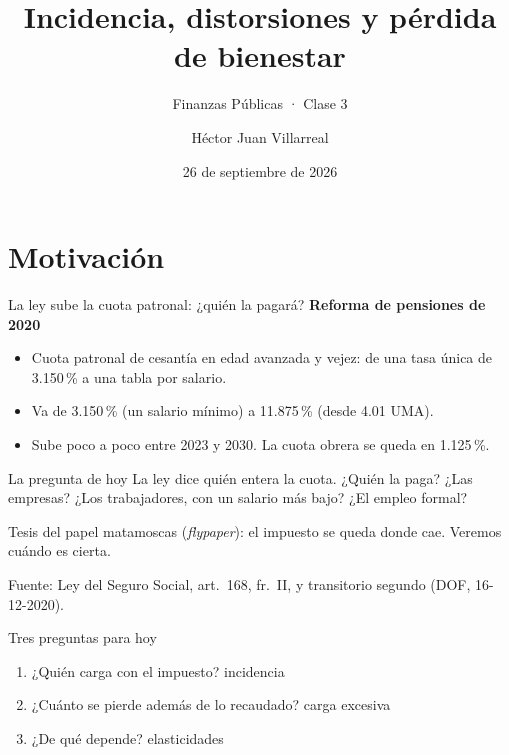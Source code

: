 \documentclass[aspectratio=169,11pt]{beamer}
\title{Incidencia, distorsiones y pérdida de bienestar}
\subtitle{Finanzas Públicas · Clase 3}
\author{Héctor Juan Villarreal}
\institute{Maestría en Economía Aplicada\\Escuela de Gobierno y Transformación Pública · Tec de Monterrey}
\date{26 de septiembre de 2026}
\newcommand{\fuente}[1]{\par\vfill{\small\color{cGris}#1\par}}
\begin{document}
\section{Motivación}

\begin{frame}[plain]
  \titlepage
\end{frame}

\begin{frame}{La ley sube la cuota patronal: ¿quién la pagará?}
  \textbf{Reforma de pensiones de 2020}
  \begin{itemize}
    \item Cuota patronal de cesantía en edad avanzada y vejez: de una tasa única de 3.150\,\% a una tabla por salario.
    \item Va de 3.150\,\% (un salario mínimo) a 11.875\,\% (desde 4.01 UMA).
    \item Sube poco a poco entre 2023 y 2030. La cuota obrera se queda en 1.125\,\%.
  \end{itemize}
  \pause
  \begin{block}{La pregunta de hoy}
    La ley dice quién entera la cuota. ¿Quién la paga? ¿Las empresas? ¿Los trabajadores, con un salario más bajo? ¿El empleo formal?
  \end{block}
  \pause
  Tesis del papel matamoscas (\emph{flypaper}): el impuesto se queda donde cae. Veremos cuándo es cierta.
  \fuente{Fuente: Ley del Seguro Social, art.~168, fr.~II, y transitorio segundo (DOF, 16-12-2020).}
\end{frame}

\begin{frame}{Tres preguntas para hoy}
  \begin{enumerate}
    \item ¿Quién carga con el impuesto? \hfill\textcolor{cGris}{incidencia}
    \item ¿Cuánto se pierde además de lo recaudado? \hfill\textcolor{cGris}{carga excesiva}
    \item ¿De qué depende? \hfill\textcolor{cGris}{elasticidades}
  \end{enumerate}
  \vspace{1.2em}
  \centering
\end{frame}
\end{document}
